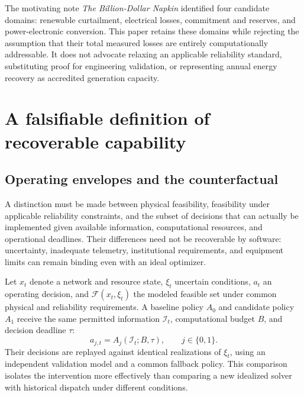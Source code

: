 \documentclass[11pt,letterpaper]{article}
\begin{document}
The motivating note \emph{The Billion-Dollar Napkin} \cite{napkin} identified four candidate domains: renewable curtailment, electrical losses, commitment and reserves, and power-electronic conversion. This paper retains these domains while rejecting the assumption that their total measured losses are entirely computationally addressable. It does not advocate relaxing an applicable reliability standard, substituting proof for engineering validation, or representing annual energy recovery as accredited generation capacity.

\section{A falsifiable definition of recoverable capability}
\subsection{Operating envelopes and the counterfactual}
A distinction must be made between physical feasibility, feasibility under applicable reliability constraints, and the subset of decisions that can actually be implemented given available information, computational resources, and operational deadlines. Their differences need not be recoverable by software: uncertainty, inadequate telemetry, institutional requirements, and equipment limits can remain binding even with an ideal optimizer.

Let $x_t$ denote a network and resource state, $\xi_t$ uncertain conditions, $a_t$ an operating decision, and $\mathcal{F}(x_t,\xi_t)$ the modeled feasible set under common physical and reliability requirements. A baseline policy $A_0$ and candidate policy $A_1$ receive the same permitted information $\mathcal{I}_t$, computational budget $B$, and decision deadline $\tau$:
\begin{equation}
a_{j,t}=A_j(\mathcal{I}_t;B,\tau),\qquad j\in\{0,1\}.
\label{eq:policy}
\end{equation}
Their decisions are replayed against identical realizations of $\xi_t$, using an independent validation model and a common fallback policy. This comparison isolates the intervention more effectively than comparing a new idealized solver with historical dispatch under different conditions.
\end{document}
